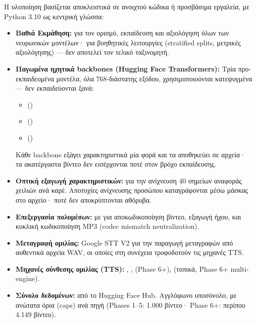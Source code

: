 Η υλοποίηση βασίζεται αποκλειστικά σε ανοιχτού κώδικα ή προσβάσιμα
εργαλεία, με Python 3.10 ως κεντρική γλώσσα:

\begin{itemize}
  \item \textbf{Βαθιά Εκμάθηση:} 
    για τον ορισμό, εκπαίδευση και αξιολόγηση όλων των νευρωνικών
    μοντέλων·  για βοηθητικές λειτουργίες
    (stratified splits, μετρικές αξιολόγησης) — δεν αποτελεί
    τον τελικό ταξινομητή.

  \item \textbf{Παγωμένα ηχητικά backbones (Hugging Face Transformers):}
    Τρία προ-εκπαιδευμένα μοντέλα, όλα 768-διάστατης εξόδου,
    χρησιμοποιούνται κατεψυγμένα — δεν εκπαιδεύονται ξανά:
    \begin{itemize}
      \item {} ()
      \item {} ()
      \item {} ()
    \end{itemize}
    Κάθε backbone εξάγει χαρακτηριστικά μία φορά και τα αποθηκεύει
    σε  αρχεία· τα ακατέργαστα βίντεο δεν εισέρχονται
    ποτέ στον βρόχο εκπαίδευσης.

  \item \textbf{Οπτική εξαγωγή χαρακτηριστικών:}
     για την ανίχνευση
    40 σημείων αναφοράς χειλιών ανά καρέ. Αποτυχίες ανίχνευσης
    προσώπου καταγράφονται μέσω μάσκας στο  αρχείο·
    ποτέ δεν αποκρύπτονται αθόρυβα.

  \item \textbf{Επεξεργασία πολυμέσων:}
     με  για αποκωδικοποίηση
    βίντεο, εξαγωγή ήχου, και κυκλική κωδικοποίηση MP3
    (codec mismatch neutralization).

  \item \textbf{Μεταγραφή ομιλίας:} Google STT V2 για την παραγωγή
    μεταγραφών από αυθεντικά αρχεία WAV, οι οποίες στη συνέχεια
    τροφοδοτούν τις μηχανές TTS.

  \item \textbf{Μηχανές σύνθεσης ομιλίας (TTS):}
    ,
    ,
     (Phase 6+),
     (τοπικά, Phase 6+ multi-engine).

  \item \textbf{Σύνολο δεδομένων:} 
    από το Hugging Face Hub. Αγγλόφωνο υποσύνολο, με ανώτατα
    όρια (caps) ανά πηγή (Phases 1–5: 1.000 βίντεο·
    Phase 6+: περίπου 4.149 βίντεο).
\end{itemize}

